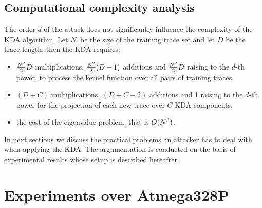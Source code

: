 \subsection{Computational complexity analysis}
The order $d$ of the attack does not significantly influence the complexity of the KDA algorithm. Let $N$ be the size of the training trace set and let $D$ be the trace length, then the KDA requires:
\begin{itemize}
\item $\frac{N^2}{2}D$ multiplications, $\frac{N^2}{2}(D-1)$ additions and $\frac{N^2}{2}D$ raising to the $d$-th power, to process the kernel function over all pairs of training traces
\item $(D+C)$ multiplications, $(D+C-2)$ additions and 1 raising to the $d$-th power for the projection of each new trace over $C$ KDA components,
\item the cost of the eigenvalue problem, that is $O(N^3)$.
\end{itemize} 

In next sections we discuss the practical problems an attacker has to deal with when applying the KDA. The argumentation is conducted on the basis of experimental results whose setup is described hereafter.

\section{Experiments over Atmega328P}\label{sec:practice}
